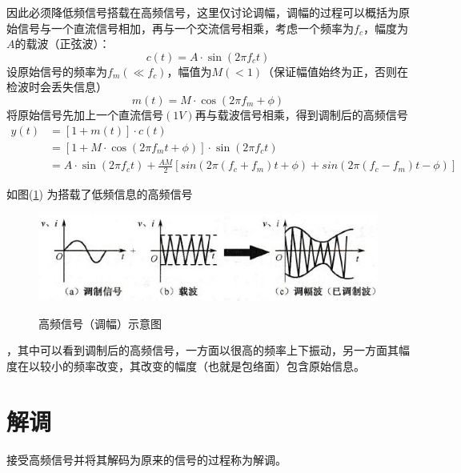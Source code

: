 \documentclass[10pt,a4paper]{article}
\theoremstyle{remark}
\begin{document}
因此必须降低频信号搭载在高频信号，这里仅讨论调幅，调幅的过程可以概括为原始信号与一个直流信号相加，再与一个交流信号相乘，考虑一个频率为$f_c$，幅度为$A$的载波（正弦波）：
\[
c(t) = A\cdot\sin(2\pi f_ct)
\]
设原始信号的频率为$f_m(\ll f_c)$，幅值为$M(<1)$（保证幅值始终为正，否则在检波时会丢失信息）
\[
m(t) = M\cdot\cos(2\pi f_m + \phi)
\]
将原始信号先加上一个直流信号$(1V)$再与载波信号相乘，得到调制后的高频信号
\[
\begin{split}
y(t) &= [1+m(t)]\cdot c(t)\\
&= [1+M\cdot\cos(2\pi f_mt+\phi)]\cdot\sin(2\pi f_ct)\\
&= A\cdot\sin(2\pi f_ct) + \frac{AM}{2}[sin(2\pi(f_c+f_m)t+\phi) + sin(2\pi(f_c-f_m)t-\phi)]
\end{split}
\]

如图(\ref{highFrequencySignal}) 为搭载了低频信息的高频信号
\begin{figure}
  \centering
  \includegraphics[scale = 1]{highFrequencySignal}\\
  \caption{高频信号（调幅）示意图}\label{highFrequencySignal}
\end{figure}
，其中可以看到调制后的高频信号，一方面以很高的频率上下振动，另一方面其幅度在以较小的频率改变，其改变的幅度（也就是包络面）包含原始信息。

\section{解调}
接受高频信号并将其解码为原来的信号的过程称为解调。
\end{document}
